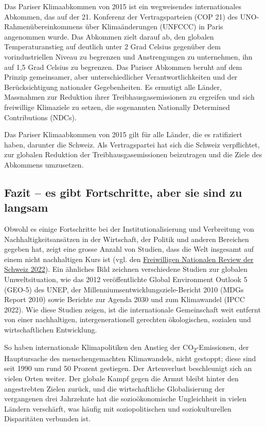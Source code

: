 \documentclass[
  nswissgerman,
  a4paper,
  DIV=11,
  numbers=noendperiod,
  oneside,
  openany]{scrreprt}
\begin{document}
Das Pariser Klimaabkommen von 2015 ist ein wegweisendes internationales
Abkommen, das auf der 21. Konferenz der Vertragsparteien (COP 21) des
UNO-Rahmenübereinkommens über Klimaänderungen (UNFCCC) in Paris
angenommen wurde. Das Abkommen zielt darauf ab, den globalen
Temperaturanstieg auf deutlich unter 2 Grad Celsius gegenüber dem
vorindustriellen Niveau zu begrenzen und Anstrengungen zu unternehmen,
ihn auf 1,5 Grad Celsius zu begrenzen. Das Pariser Abkommen beruht auf
dem Prinzip gemeinsamer, aber unterschiedlicher Verantwortlichkeiten und
der Berücksichtigung nationaler Gegebenheiten. Es ermutigt alle Länder,
Massnahmen zur Reduktion ihrer Treibhausgasemissionen zu ergreifen und
sich freiwillige Klimaziele zu setzen, die sogenannten Nationally
Determined Contributions (NDCs).

Das Pariser Klimaabkommen von 2015 gilt für alle Länder, die es
ratifiziert haben, darunter die Schweiz. Als Vertragspartei hat sich die
Schweiz verpflichtet, zur globalen Reduktion der Treibhausgasemissionen
beizutragen und die Ziele des Abkommens umzusetzen.

\subsection{Fazit -- es gibt Fortschritte, aber sie sind zu
langsam}\label{fazit-es-gibt-fortschritte-aber-sie-sind-zu-langsam}

Obwohl es einige Fortschritte bei der Institutionalisierung und
Verbreitung von Nachhaltigkeitsansätzen in der Wirtschaft, der Politik
und anderen Bereichen gegeben hat, zeigt eine grosse Anzahl von Studien,
dass die Welt insgesamt auf einem nicht nachhaltigen Kurs ist (vgl. den
\href{https://www.sdgital2030.ch/countryreport}{Freiwilligen Nationalen
Review der Schweiz 2022}). Ein ähnliches Bild zeichnen verschiedene
Studien zur globalen Umweltsituation, wie das 2012 veröffentlichte
Global Environment Outlook 5 (GEO-5) des UNEP, der
Millenniumsentwicklungsziele-Bericht 2010 (MDGs Report 2010) sowie
Berichte zur Agenda 2030 und zum Klimawandel (IPCC 2022). Wie diese
Studien zeigen, ist die internationale Gemeinschaft weit entfernt von
einer nachhaltigen, intergenerationell gerechten ökologischen, sozialen
und wirtschaftlichen Entwicklung.

So haben internationale Klimapolitiken den Anstieg der
CO\textsubscript{2}-Emissionen, der Hauptursache des menschengemachten
Klimawandels, nicht gestoppt; diese sind seit 1990 um rund 50 Prozent
gestiegen. Der Artenverlust beschleunigt sich an vielen Orten weiter.
Der globale Kampf gegen die Armut bleibt hinter den angestrebten Zielen
zurück, und die wirtschaftliche Globalisierung der vergangenen drei
Jahrzehnte hat die sozioökonomische Ungleichheit in vielen Ländern
verschärft, was häufig mit soziopolitischen und soziokulturellen
Disparitäten verbunden ist.
\end{document}
